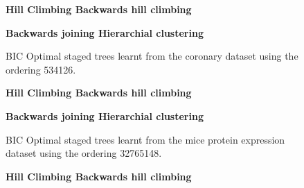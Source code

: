 \documentclass{tufte-book}
\begin{document}
\begin{Definition}
\begin{figure}
   \begin{floatrow}
   \centering
   \textbf{\hspace{10mm}Hill Climbing \hspace{50mm} Backwards hill climbing}\par\medskip
{}%
\hfill
{}
   \end{floatrow}

   
      \begin{floatrow}
   \centering
   \textbf{\hspace{5mm}Backwards joining \hspace{55mm} Hierarchial clustering}\par\medskip
{}%
\hfill
{}%
   \end{floatrow}
   \caption{BIC Optimal staged trees learnt from the coronary dataset using the ordering 534126.}
\end{figure}

\begin{figure}
   \begin{floatrow}
   \centering
   \textbf{\hspace{10mm}Hill Climbing \hspace{50mm} Backwards hill climbing}\par\medskip
{}%
\hfill
{}
   \end{floatrow}

   
      \begin{floatrow}
   \centering
   \textbf{\hspace{5mm}Backwards joining \hspace{55mm} Hierarchial clustering}\par\medskip
{}%
\hfill
{}%
   \end{floatrow}
   \caption{BIC Optimal staged trees learnt from the mice protein expression dataset using the ordering 32765148.}
\end{figure}

\begin{figure}
   \begin{floatrow}
   \centering
   \textbf{\hspace{10mm}Hill Climbing \hspace{50mm} Backwards hill climbing}\par\medskip
{}%
\hfill
{}
   \end{floatrow}


\end{figure}
\end{Definition}
\end{document}
